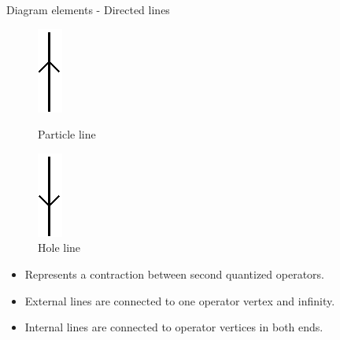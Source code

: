 \begin{frame}{Diagram elements - Directed lines}

    \begin{figure}
    \centering
        \parbox{0.35\textwidth}{
            \centering
            \includegraphics[scale=0.75]{graphics/particleline}
            \caption{Particle line}
        } \qquad
        \parbox{0.35\textwidth}{
            \centering
            \includegraphics[scale=0.75]{graphics/holeline}
            \caption{Hole line}
        }
    \end{figure}

    \begin{itemize}
        \item Represents a contraction between second quantized operators.
        \item External lines are connected to one operator vertex and infinity.
        \item Internal lines are connected to operator vertices in both ends.
    \end{itemize}

\end{frame}

    
